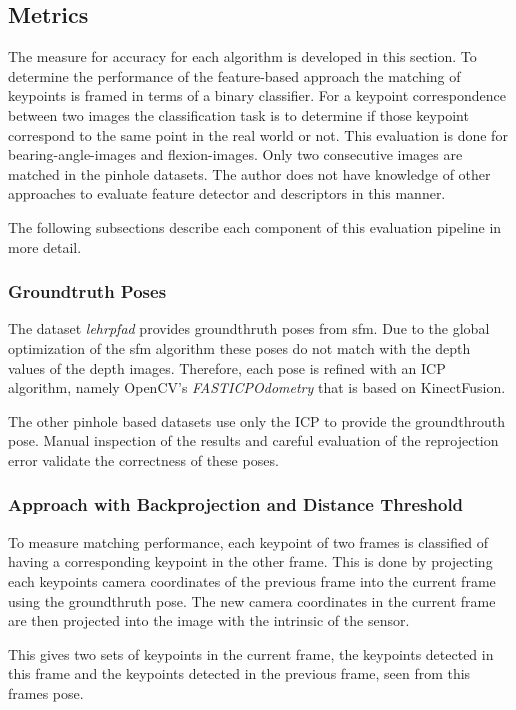\subsection{Metrics}

The measure for accuracy for each algorithm is developed in this section.
To determine the performance of the feature-based approach the matching of keypoints is framed in terms of a binary classifier.
For a keypoint correspondence between two images the classification task is to determine if those keypoint correspond to the same point in the real world or not.
This evaluation is done for \Glspl{bearing-angle-image} and \Glspl{flexion-image}.
Only two consecutive images are matched in the pinhole datasets. 
The author does not have knowledge of other approaches to evaluate feature detector and descriptors in this manner.

The following subsections describe each component of this evaluation pipeline in more detail.

\subsubsection{Groundtruth Poses}

The dataset \emph{lehrpfad} provides groundthruth poses from \gls{sfm}.
Due to the global optimization of the \gls{sfm} algorithm these poses do not match with the depth values of the depth images.
Therefore, each pose is refined with an ICP algorithm, namely OpenCV's \emph{FASTICPOdometry} that is based on KinectFusion\cite{newcombe_ismar2011}.

The other pinhole based datasets use only the ICP to provide the groundthrouth pose.
Manual inspection of the results and careful evaluation of the reprojection error validate the correctness of these poses.

\subsubsection{Approach with Backprojection and Distance Threshold}

To measure matching performance, each keypoint of two frames is classified of having a corresponding keypoint in the other frame.
This is done by projecting each keypoints camera coordinates of the previous frame into the current frame using the groundthruth pose.
The new camera coordinates in the current frame are then projected into the image with the intrinsic of the sensor.

This gives two sets of keypoints in the current frame, the keypoints detected in this frame and the keypoints detected in the previous frame, seen from this frames pose.

